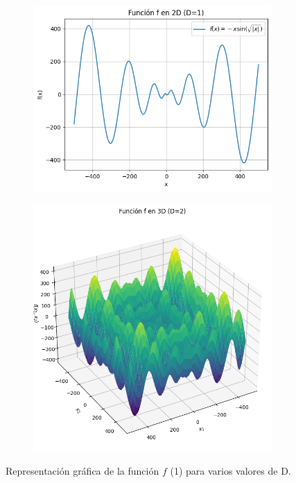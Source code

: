 \documentclass[10pt,a4paper,twocolumn]{article}
\begin{document}
			\begin{figure}[htb!]
					\centering
			\begin{subfigure}{.75\linewidth}
				\includegraphics[height=.95\linewidth, width=.95\linewidth]{assets/f_2d}
				\caption{}
				\label{fig:1a}
			\end{subfigure}
			\begin{subfigure}{.75\linewidth}
				\includegraphics[height=.95\linewidth, width=.95\linewidth]{assets/f_3d}
				\caption{}
				\label{fig:1b}
			\end{subfigure}
			\caption{Representación gráfica de la función $f$ (1) para varios valores de D.}
			\label{fig:1}
		\end{figure}
	
\end{document}
